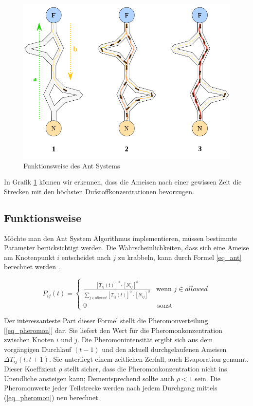 \begin{figure}[h!]
    \centering
    \includegraphics[scale=0.45]{resources/swarm_ant_system.png}
    \caption{Funktionsweise des Ant Systems \cite{Wiki03}}
    \label{fig:swarm}
  \end{figure}

In Grafik \ref{fig:swarm} können wir erkennen, dass die Ameisen nach einer gewissen Zeit die Strecken mit den
höchsten Dufstoffkonzentrationen bevorzugen.

\subsection{Funktionsweise}
Möchte man den Ant System Algorithmus implementieren, müssen bestimmte Parameter berücksichtigt werden. Die
Wahrscheinlichkeiten, dass sich eine Ameise am Knotenpunkt $i$ entscheidet nach $j$ zu krabbeln, kann durch
Formel \ref{eq_ant} berechnet werden \cite{Blu03}. 

\begin{equation}
    \label{eq_ant}
    P_{ij}(t) = \begin{cases}
        \frac{[T_{ij}(t)]^\alpha \cdot [N_{ij}]^\beta}
        {\sum_{j \in {allowed}}^{} [T_{ij}(t)]^\alpha \cdot [N_{ij}]^\beta} & \text{wenn } j \in {allowed} \\
        0 & \, \text{sonst}
        \end{cases}
\end{equation}
\label{eq_ant1}

Der interessanteste Part dieser Formel stellt die Pheromonverteilung [\ref{eq_pheromon}] dar. Sie liefert den Wert
für die Pheromonkonzentration zwischen Knoten $i$ und $j$. Die Pheromonintensität ergibt sich
aus dem vorgängigen Durchlauf $(t-1)$ und den aktuell durchgelaufenen Ameisen $\Delta T_{ij}(t, t+1)$. Sie
unterliegt einem zeitlichen Zerfall, auch Evaporation genannt. Dieser Koeffizient $\rho$  stellt sicher, dass
die Pheromonkonzentration nicht ins Unendliche ansteigen kann; Dementsprechend sollte auch $\rho < 1$ sein.
Die Pheromonwerte jeder Teilstrecke werden nach jedem Durchgang mittels (\ref{eq_pheromon}) neu berechnet.

